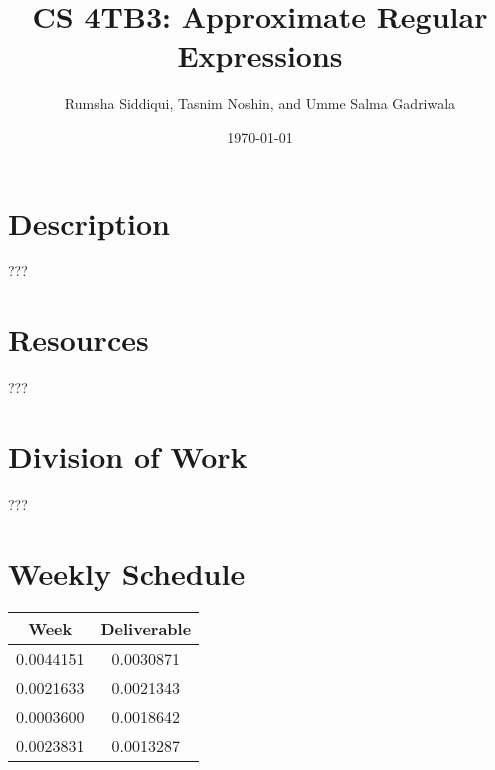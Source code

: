 \documentclass[letterpaper,12pt]{article}
\begin{document}
\title{CS 4TB3: Approximate Regular Expressions}
\author{Rumsha Siddiqui, Tasnim Noshin, and Umme Salma Gadriwala}
\date{\today}
\maketitle



\section{Description}

???


\section{Resources}
???

\section{Division of Work}

???

\section{Weekly Schedule}


\begin{table}[ht]
\begin{center}

\label{tbl:bins} %
\begin{tabular}{|cc|} 
\hline
\multicolumn{1}{|c}{\textbf{Week}} & \multicolumn{1}{c|}{\textbf{Deliverable}} \\
\hline
0.0044151 &   0.0030871 \\
0.0021633 &   0.0021343 \\
0.0003600 &   0.0018642 \\
0.0023831 &   0.0013287 \\
\hline
\end{tabular}
\end{center}
\end{table}
\end{document}
